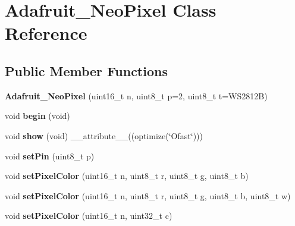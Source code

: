 \hypertarget{classAdafruit__NeoPixel}{}\section{Adafruit\+\_\+\+Neo\+Pixel Class Reference}
\label{classAdafruit__NeoPixel}
\subsection*{Public Member Functions}
\begin{DoxyCompactItemize}
\item 
\mbox{\label{classAdafruit__NeoPixel_ae05e401ec85209bd15c16effbcd569dc}} 
{\bfseries Adafruit\+\_\+\+Neo\+Pixel} (uint16\+\_\+t n, uint8\+\_\+t p=2, uint8\+\_\+t t=W\+S2812B)
\item 
\mbox{\label{classAdafruit__NeoPixel_ac1cb16509be644232ce0e28d250083da}} 
void {\bfseries begin} (void)
\item 
\mbox{\label{classAdafruit__NeoPixel_aca0620750108340cc5b9aac8db885c77}} 
void {\bfseries show} (void) \+\_\+\+\_\+attribute\+\_\+\+\_\+((optimize(\char`\"{}Ofast\char`\"{})))
\item 
\mbox{\label{classAdafruit__NeoPixel_a64a6704fdac239046791e7a9f7a76ab6}} 
void {\bfseries set\+Pin} (uint8\+\_\+t p)
\item 
\mbox{\label{classAdafruit__NeoPixel_ab8763ccc6f9a090df1f753905fd5561e}} 
void {\bfseries set\+Pixel\+Color} (uint16\+\_\+t n, uint8\+\_\+t r, uint8\+\_\+t g, uint8\+\_\+t b)
\item 
\mbox{\label{classAdafruit__NeoPixel_ac7b3529b3d190f3af5d8e5b9ead27688}} 
void {\bfseries set\+Pixel\+Color} (uint16\+\_\+t n, uint8\+\_\+t r, uint8\+\_\+t g, uint8\+\_\+t b, uint8\+\_\+t w)
\item 
\mbox{\label{classAdafruit__NeoPixel_a19fc274330c0e65907929ee03b93b1c3}} 
void {\bfseries set\+Pixel\+Color} (uint16\+\_\+t n, uint32\+\_\+t c)
\item 
\mbox{\label{classAdafruit__NeoPixel_aa05f7d37828c43fef00e6242dcf75959}} 

\end{DoxyCompactItemize}
